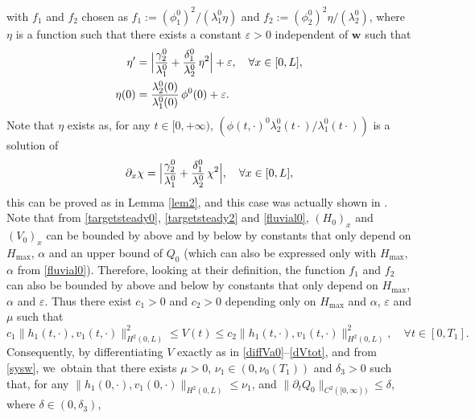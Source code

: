 \documentclass[11pt]{article}
\numberwithin{equation}{section}
\theoremstyle{definition}
\begin{document}
with $f_{1}$ and $f_{2}$ chosen as $f_{1}:=(\phi_{1}^{0})^{2}/(\lambda_{1}^{0}\eta)$ and $f_{2}:=(\phi_{2}^{0})^{2}\eta/(\lambda_{2}^{0})$,
where $\eta$ is a function such that there exists a constant $\varepsilon>0$ independent of $\boldsymbol{w}$ such that
\begin{equation*}
\begin{split}
\eta'&=\Bigl|\frac{\gamma_{2}^{0}}{\lambda_{1}^{0}}+\frac{\delta_{1}^{0}}{\lambda_{2}^{0}}\,\eta^{2}\Bigr|+\varepsilon,\quad \forall x\in[0,L],\\
\eta(0)&=\frac{\lambda_{2}^{0}(0)}{\lambda_{1}^{0}(0)}\,\phi^{0}(0)+\varepsilon.
\end{split}
\end{equation*}
Note that $\eta$ exists as, for any $t\in[0,+\infty)$, $(\phi(t,\cdot)^{0}\lambda_{2}^{0}(t\cdot)/\lambda_{1}^{0}(t\cdot))$ is a solution of
\begin{equation*}
\partial_{x} \chi=\Bigl|\frac{\gamma_{2}^{0}}{\lambda_{1}^{0}}+\frac{\delta_{1}^{0}}{\lambda_{2}^{0}}\,\chi^{2}\Bigr|, \quad\forall x\in[0,L],
\end{equation*}
this can be proved as in Lemma \ref{lem2}, and this case was actually shown in \cite{HS}.
Note that from \eqref{targetsteady0}, \eqref{targetsteady2} and \eqref{fluvial0}, $(H_{0})_{x}$ and $(V_{0})_{x}$ can be bounded by above and by below by constants that only depend on $H_{\max}$, $\alpha$ and an upper bound of $Q_{0}$ (which can also be expressed only with $H_{\max}$, $\alpha$ from \eqref{fluvial0}). Therefore, looking at their definition, the function $f_{1}$ and $f_{2}$ can also be bounded by above and below by constants that only depend on $H_{\max}$, $\alpha$ and $\varepsilon$. Thus there exist $c_{1}>0$ and $c_{2}>0$ depending only on $H_{\max}$ and $\alpha$, $\varepsilon$ and $\mu$ such that
\begin{equation}
c_{1}\lVert h_{1}(t,\cdot),v_{1}(t,\cdot)\rVert_{H^{2}(0,L)}^{2}\leq V(t)\leq c_{2}\lVert h_{1}(t,\cdot),v_{1}(t,\cdot)\rVert_{H^{2}(0,L)}^{2},\quad\forall t\in[0,T_{1}].
\label{equiv2}
\end{equation}
Consequently, by differentiating $V$ exactly as in \eqref{diffVa0}--\eqref{dVtot}, and from \eqref{sysw}, we~obtain that there exists $\mu>0$, $\nu_{1}\in(0,\nu_{0}(T_{1}))$ and ${\delta_{3}}>0$ such that, for any $\lVert h_{1}(0,\cdot),v_{1}(0,\cdot)\rVert_{H^{2}(0,L)}\leq \nu_{1}$,
and $\lVert\partial_{t}Q_{0}\rVert_{C^{2}([0,\infty))}\leq \delta$, where $\delta\in(0,\delta_{3})$,
\end{document}
